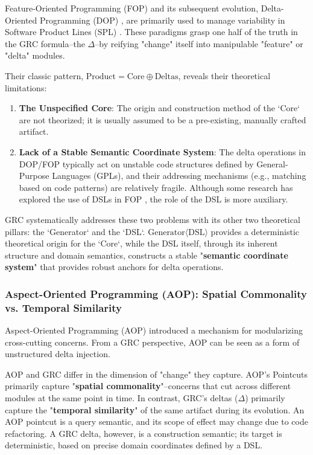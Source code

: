 \documentclass[11pt]{article}
\begin{document}
Feature-Oriented Programming (FOP) \cite{batory2004} and its subsequent evolution, Delta-Oriented Programming (DOP) \cite{schaefer2010}, are primarily used to manage variability in Software Product Lines (SPL) \cite{pohl2005}. These paradigms grasp one half of the truth in the GRC formula--the $\Delta$--by reifying "change" itself into manipulable "feature" or "delta" modules.

Their classic pattern, $\text{Product} = \text{Core} \oplus \text{Deltas}$, reveals their theoretical limitations:
\begin{enumerate}
    \item \textbf{The Unspecified Core}: The origin and construction method of the `Core` are not theorized; it is usually assumed to be a pre-existing, manually crafted artifact.
    \item \textbf{Lack of a Stable Semantic Coordinate System}: The delta operations in DOP/FOP typically act on unstable code structures defined by General-Purpose Languages (GPLs), and their addressing mechanisms (e.g., matching based on code patterns) are relatively fragile. Although some research has explored the use of DSLs in FOP \cite{kaestner2009}, the role of the DSL is more auxiliary.
\end{enumerate}

GRC systematically addresses these two problems with its other two theoretical pillars: the `Generator` and the `DSL`. $\text{Generator}\langle\text{DSL}\rangle$ provides a deterministic theoretical origin for the `Core`, while the DSL itself, through its inherent structure and domain semantics, constructs a stable "\textbf{semantic coordinate system}" that provides robust anchors for delta operations.

\subsubsection{Aspect-Oriented Programming (AOP): Spatial Commonality vs. Temporal Similarity}

Aspect-Oriented Programming (AOP) \cite{kiczales1997} introduced a mechanism for modularizing cross-cutting concerns. From a GRC perspective, AOP can be seen as a form of unstructured delta injection.

AOP and GRC differ in the dimension of "change" they capture. AOP's Pointcuts primarily capture "\textbf{spatial commonality}"--concerns that cut across different modules at the same point in time. In contrast, GRC's deltas ($\Delta$) primarily capture the "\textbf{temporal similarity}" of the same artifact during its evolution. An AOP pointcut is a query semantic, and its scope of effect may change due to code refactoring. A GRC delta, however, is a construction semantic; its target is deterministic, based on precise domain coordinates defined by a DSL.
\end{document}
